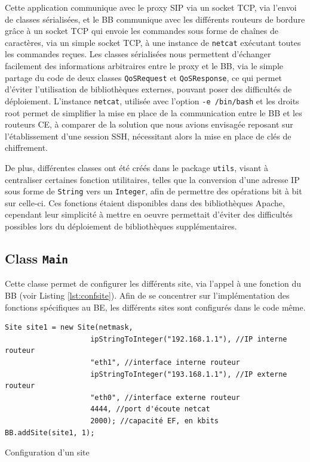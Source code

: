 \documentclass[a4paper,11pt]{article}
\let\Oldsubsection\subsection
\renewcommand{\subsection}{\FloatBarrier\Oldsubsection}
\begin{document}
Cette application communique avec le proxy SIP via un socket TCP, via l'envoi de classes sérialisées, et le BB communique avec les différents routeurs de bordure grâce à un socket TCP qui envoie les commandes sous forme de chaînes de caractères, via un simple socket TCP, à une instance de \texttt{netcat} exécutant toutes les commandes reçues. 
Les classes sérialisées nous permettent d'échanger facilement des informations arbitraires entre le proxy et le BB, via le simple partage du code de deux classes \texttt{QoSRequest} et \texttt{QoSResponse}, ce qui permet d'éviter l'utilisation de bibliothèques externes, pouvant poser des difficultés de déploiement.
L'instance \texttt{netcat}, utilisée avec l'option \texttt{-e /bin/bash} et les droits root permet de simplifier la mise en place de la communication entre le BB et les routeurs CE, à comparer de la solution que nous avions envisagée reposant sur l'établissement d'une session SSH, nécessitant alors la mise en place de clés de chiffrement.

De plus, différentes classes ont été créés dans le package \texttt{utils}, visant à centraliser certaines fonction utilitaires, telles que la conversion d'une adresse IP sous forme de \texttt{String} vers un \texttt{Integer}, afin de permettre des opérations bit à bit sur  celle-ci. Ces fonctions étaient disponibles dans des bibliothèques Apache, cependant leur simplicité à mettre en oeuvre permettait d'éviter des difficultés possibles lors du déploiement de bibliothèques supplémentaires.


\subsection{Class \texttt{Main}}

Cette classe permet de configurer les différents site, via l'appel à une fonction du BB (voir Listing \ref{lst:confsite}). Afin de se concentrer sur l'implémentation des fonctions spécifiques au BE, les différents sites sont configurés dans le code même.

\begin{listing}[htp]
    \begin{verbatim}
Site site1 = new Site(netmask,
                    ipStringToInteger("192.168.1.1"), //IP interne routeur
                    "eth1", //interface interne routeur
                    ipStringToInteger("193.168.1.1"), //IP externe routeur
                    "eth0", //interface externe routeur
                    4444, //port d'écoute netcat
                    2000); //capacité EF, en kbits
BB.addSite(site1, 1);
  \end{verbatim}
    \caption{Configuration d'un site}
    \label{lst:confsite}
\end{listing}
\end{document}
